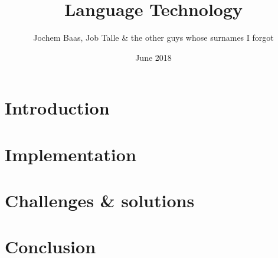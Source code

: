 \documentclass{article}
\title{Language Technology}
\author{Jochem Baas, Job Talle \& the other guys whose surnames I forgot}
\date{June 2018}
\begin{document}
\maketitle

\section{Introduction}

\section{Implementation}

\section{Challenges \& solutions}

\section{Conclusion}
\end{document}
